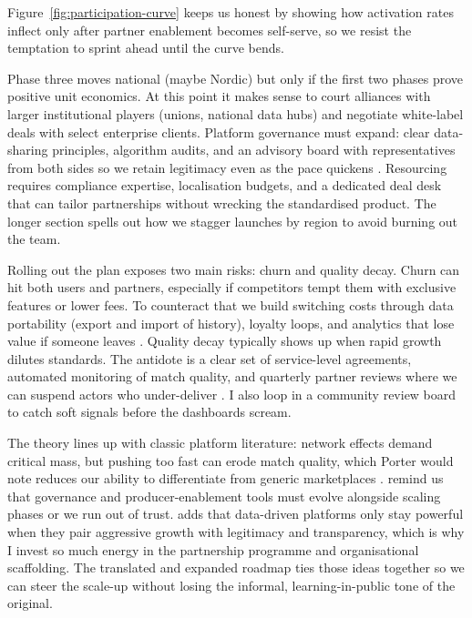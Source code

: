 Figure~\ref{fig:participation-curve} keeps us honest by showing how activation rates inflect only after partner enablement becomes self-serve, so we resist the temptation to sprint ahead until the curve bends.

Phase three moves national (maybe Nordic) but only if the first two phases prove positive unit economics. At this point it makes sense to court alliances with larger institutional players (unions, national data hubs) and negotiate white-label deals with select enterprise clients. Platform governance must expand: clear data-sharing principles, algorithm audits, and an advisory board with representatives from both sides so we retain legitimacy even as the pace quickens \citep{Srnicek2017,Zuboff2019}. Resourcing requires compliance expertise, localisation budgets, and a dedicated deal desk that can tailor partnerships without wrecking the standardised product. The longer section spells out how we stagger launches by region to avoid burning out the team.

Rolling out the plan exposes two main risks: churn and quality decay. Churn can hit both users and partners, especially if competitors tempt them with exclusive features or lower fees. To counteract that we build switching costs through data portability (export and import of history), loyalty loops, and analytics that lose value if someone leaves \citep{FarrellSaloner1986,ShapiroVarian1999}. Quality decay typically shows up when rapid growth dilutes standards. The antidote is a clear set of service-level agreements, automated monitoring of match quality, and quarterly partner reviews where we can suspend actors who under-deliver \citep{Reillier2017}. I also loop in a community review board to catch soft signals before the dashboards scream.

The theory lines up with classic platform literature: network effects demand critical mass, but pushing too fast can erode match quality, which Porter would note reduces our ability to differentiate from generic marketplaces \citep{Porter2008}. \citet{Choudary2016} remind us that governance and producer-enablement tools must evolve alongside scaling phases or we run out of trust. \citet{Srnicek2017} adds that data-driven platforms only stay powerful when they pair aggressive growth with legitimacy and transparency, which is why I invest so much energy in the partnership programme and organisational scaffolding. The translated and expanded roadmap ties those ideas together so we can steer the scale-up without losing the informal, learning-in-public tone of the original.
